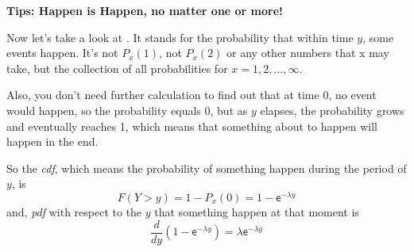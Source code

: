 \documentclass[12pt]{article}
\begin{document}
\textbf{Tips: Happen is Happen,  no matter one or more!}

Now let's take a look at .  It stands for the probability that within time $y$,  some events happen.  It's not $P_x (1)$,  not $P_x (2)$ or any other numbers that x may take,  but the collection of all probabilities for $x=1, 2, \dots, \infty$.   

Also,  you don't need further calculation to find out that at time 0,  no event would happen,  so the probability equals 0,  but as $y$ elapses, the probability grows and eventually reaches 1,  which means that something about to happen will happen in the end.

So the \textit{cdf},  which means the probability of something happen during the period of $y$,  is 
$$F(Y>y)=  1- P_x (0) = 1-  \mathsf{e}^{-\lambda y} $$ 
and,  \textit{pdf} with respect to the $y$ that something happen at that moment  is 
$$ \frac{d}{dy} (1-  \mathsf{e}^{-\lambda y} ) = \lambda \mathsf{e}^{-\lambda y} $$






\vspace{20pt}






\printbibliography[title={Reference}]


\end{document}
